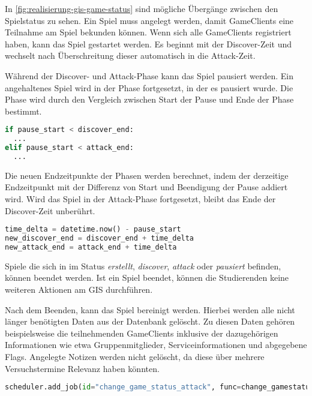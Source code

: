 In \autoref{fig:realisierung-gis-game-status} sind mögliche Übergänge zwischen den Spielstatus zu sehen. Ein Spiel muss angelegt werden, damit GameClients eine Teilnahme am Spiel bekunden können. Wenn sich alle GameClients registriert haben, kann das Spiel gestartet werden. Es beginnt mit der Discover-Zeit und wechselt nach Überschreitung dieser automatisch in die Attack-Zeit.

Während der Discover- und Attack-Phase kann das Spiel pausiert werden. Ein angehaltenes Spiel wird in der Phase fortgesetzt, in der es pausiert wurde. Die Phase wird durch den Vergleich zwischen Start der Pause und Ende der Phase bestimmt.

\begin{lstlisting}[language=Python, frame=single, caption={GIS Spiel fortsetzen}, captionpos=b, label={lst:gis-resume-game}]
if pause_start < discover_end:
  ...
elif pause_start < attack_end:
  ...
\end{lstlisting}

Die neuen Endzeitpunkte der Phasen werden berechnet, indem der derzeitige Endzeitpunkt mit der Differenz von Start und Beendigung der Pause addiert wird. Wird das Spiel in der Attack-Phase fortgesetzt, bleibt das Ende der Discover-Zeit unberührt. \\

\begin{lstlisting}[language=Python, frame=single, caption={GIS Neues Ende berechnen}, captionpos=b, label={lst:gis-pause-add-time}]
time_delta = datetime.now() - pause_start
new_discover_end = discover_end + time_delta
new_attack_end = attack_end + time_delta
\end{lstlisting}

Spiele die sich in im Status \textit{erstellt}, \textit{discover}, \textit{attack} oder \textit{pausiert} befinden, können beendet werden. Ist ein Spiel beendet, können die Studierenden keine weiteren Aktionen am GIS durchführen.

Nach dem Beenden, kann das Spiel bereinigt werden. Hierbei werden alle nicht länger benötigten Daten aus der Datenbank gelöscht. Zu diesen Daten gehören beispielsweise die teilnehmenden GameClients inklusive der dazugehörigen Informationen wie etwa Gruppenmitglieder, Serviceinformationen und abgegebene Flags. Angelegte Notizen werden nicht gelöscht, da diese über mehrere Versuchstermine Relevanz haben könnten.\\

\begin{lstlisting}[language=Python, frame=single, caption={GIS Scheduler Jobs}, captionpos=b, label={lst:gis-scheduler-jobs}]
scheduler.add_job(id="change_game_status_attack", func=change_gamestatus, trigger='date', run_date=discover_end_datetime)
\end{lstlisting}

